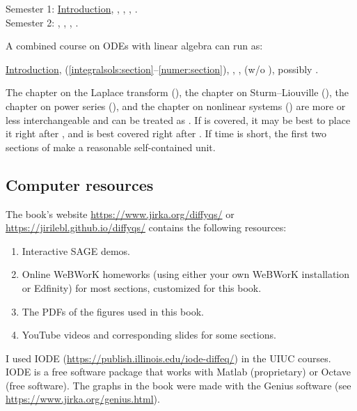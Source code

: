 \medskip

\noindent
Semester 1:
\hyperref[intro:chapter]{Introduction},
,
,
,
.
\\
Semester 2:
,
,
,
.

\medskip

A combined course on ODEs with linear algebra can run as:

\medskip

\noindent
\hyperref[intro:chapter]{Introduction},
 (\ref{integralsols:section}--\ref{numer:section}),
,
,
 (w/o ), possibly
.

\medskip

The chapter on
the Laplace transform (),
the chapter on Sturm--Liouville (),
the chapter on power series (),
and the chapter on nonlinear systems ()
are more or less interchangeable and can be treated as .
If  is covered, it may be best to place it right
after ,
and  is best covered right after
.
If time is short, the first two sections of
 make a reasonable self-contained unit.

\subsection{Computer resources}

The book's
website
\url{https://www.jirka.org/diffyqs/}
or
\url{https://jirilebl.github.io/diffyqs/}
contains the following resources:
\begin{enumerate}
\item Interactive SAGE demos.
\item Online WeBWorK homeworks
(using either your own WeBWorK installation or Edfinity)
for most sections, customized for this book.
\item The PDFs of the figures used in this book.
\item YouTube videos and corresponding slides for some sections.
\end{enumerate}

I used IODE
(\url{https://publish.illinois.edu/iode-diffeq/})
in the UIUC courses.
IODE is a free software package that
works with Matlab (proprietary) or Octave (free software).
The graphs in the book were made with
the Genius software
(see \url{https://www.jirka.org/genius.html}).

